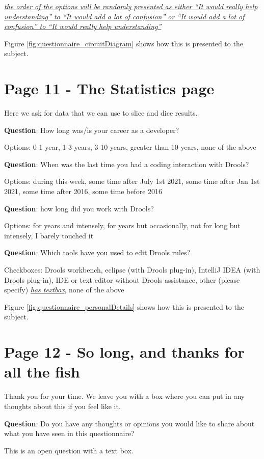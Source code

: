 \emph{\underline{the order of the options will be randomly presented as either ``It would really help understanding'' to ``It would add a lot of confusion'' or ``It would add a lot of confusion'' to ``It would really help understanding''}}

Figure \ref{fig:questionnaire_circuitDiagram} shows how this is presented to the subject.

\section*{Page 11 - The Statistics page}
Here we ask for data that we can use to slice and dice results.

\textbf{Question}: How long was/is your career as a developer?

Options: 0-1 year, 1-3 years, 3-10 years, greater than 10 years, none of the above

\textbf{Question}: When was the last time you had a coding interaction with Drools?

Options: during this week, some time after July 1st 2021, some time after Jan 1st 2021, some time after 2016, some time before 2016

\textbf{Question}: how long did you work with Drools?

Options: for years and intensely, for years but occasionally, not for long but intensely, I barely touched it


\textbf{Question}: Which tools have you used to edit Drools rules?

Checkboxes: Drools workbench, eclipse (with Drools plug-in), IntelliJ IDEA (with Drools plug-in), IDE or text editor without Drools assistance, other (please specify) \emph{\underline{has textbox}}, none of the above

Figure \ref{fig:questionnaire_personalDetails} shows how this is presented to the subject.

\section*{Page 12 - So long, and thanks for all the fish}
Thank you for your time.
We leave you with a box where you can put in any thoughts about this if you feel like it.

\textbf{Question}: Do you have any thoughts or opinions you would like to share about what you have seen in this questionnaire?

This is an open question with a text box.


